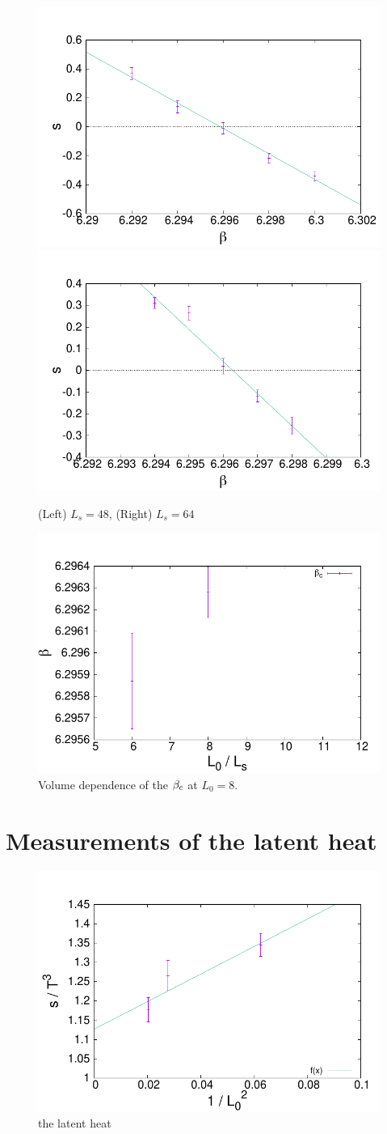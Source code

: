 \documentclass{article}
\begin{document}
\begin{figure}[h]
    \centering
    \includegraphics[width=0.33\hsize]{figures/L0_8/plot_s_4pol_Ls_48.pdf}
    \includegraphics[width=0.33\hsize]{figures/L0_8/plot_s_4pol_Ls_64.pdf}
    \caption{(Left) $L_s=48$, (Right) $L_s=64$}
    \label{fig:L0_8_beta_c}
\end{figure}

\begin{figure}[h]
    \centering
    \includegraphics[width=0.5\hsize]{figures/L0_8/vol_dep.pdf}
    \caption{Volume dependence of the $\beta_{\rm c}$ at $L_0 = 8$.}
    \label{fig:L0_8_beta_c_vol}
\end{figure}
\newpage
\section{Measurements of the latent heat}
\begin{figure}[H]
    \centering
    \includegraphics[width=0.5\hsize]{figures/plot_LH_v2.pdf}
    \caption{the latent heat}
    \label{fig:lat_heat}
\end{figure}
\newpage
\end{document}
